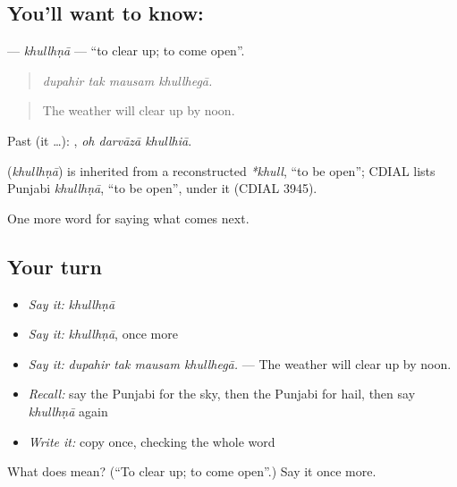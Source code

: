 \subsection*{You'll want to know: }
\textbf{} — \emph{khullhṇā} — \textquotedblleft{}to clear up; to come open\textquotedblright{}.

\begin{quote}
   
\end{quote}

\begin{quote}
\emph{dupahir tak mausam khullhegā.}
\end{quote}

\begin{quote}
The weather will clear up by noon.
\end{quote}

Past (it …):   , \emph{oh darvāzā khullhiā}.

\begin{cousinweb}
\textbf{} (\emph{khullhṇā}) is inherited from a reconstructed \emph{*khull}, \textquotedblleft{}to be open\textquotedblright{}; CDIAL lists Punjabi \emph{khullhṇā}, \textquotedblleft{}to be open\textquotedblright{}, under it (CDIAL 3945).
\end{cousinweb}

\begin{grammarlens}[title={What you've built}]
One more word for saying what comes next.
\end{grammarlens}

\subsection*{Your turn}
\begin{itemize}
\raggedright
  \item \emph{Say it:} \emph{khullhṇā}
  \item \emph{Say it:} \emph{khullhṇā}, once more
  \item \emph{Say it:} \emph{dupahir tak mausam khullhegā.} — The weather will clear up by noon.
  \item \emph{Recall:} say the Punjabi for the sky, then the Punjabi for hail, then say \emph{khullhṇā} again
  \item \emph{Write it:} copy \textbf{} once, checking the whole word
\end{itemize}

\begin{tcolorbox}[breakable,colback=teal!4,colframe=teal!35!black,title={Before you move on}]
What does  mean? (\textquotedblleft{}To clear up; to come open\textquotedblright{}.) Say it once more.
\end{tcolorbox}
